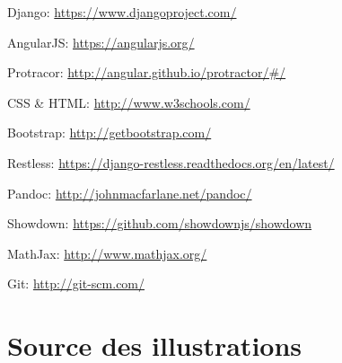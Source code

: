 \documentclass[a4paper,10pt,twoside]{sphinxmanual}
\begin{document}
Django: \href{https://www.djangoproject.com/}{https://www.djangoproject.com/}

AngularJS: \href{https://angularjs.org/}{https://angularjs.org/}

Protracor: \href{http://angular.github.io/protractor/\#/}{http://angular.github.io/protractor/\#/}

CSS \& HTML: \href{http://www.w3schools.com/}{http://www.w3schools.com/}

Bootstrap: \href{http://getbootstrap.com/}{http://getbootstrap.com/}

Restless: \href{https://django-restless.readthedocs.org/en/latest/}{https://django-restless.readthedocs.org/en/latest/}

Pandoc: \href{http://johnmacfarlane.net/pandoc/}{http://johnmacfarlane.net/pandoc/}

Showdown: \href{https://github.com/showdownjs/showdown}{https://github.com/showdownjs/showdown}

MathJax: \href{http://www.mathjax.org/}{http://www.mathjax.org/}

Git: \href{http://git-scm.com/}{http://git-scm.com/}


\chapter{Source des illustrations}
\label{illustration::doc}\label{illustration:source-des-illustrations}\begingroup
\let\clearpage\relax
\renewcommand*\listfigurename{Tables}
\listoffigures
\endgroup


\renewcommand{\indexname}{Index}
\printindex
\end{document}

